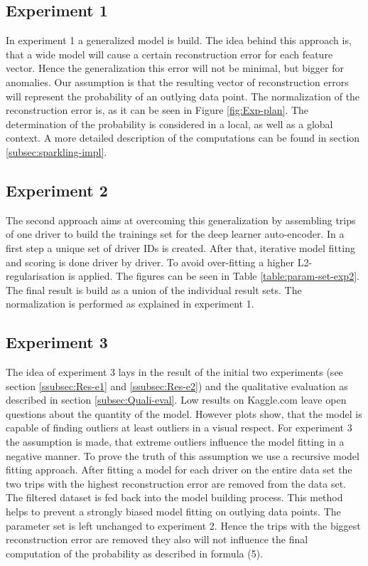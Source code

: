 \documentclass{vldb}
\begin{document}
\subsection{Experiment 1}
\label{subsec:exp-1}
In experiment 1 a generalized model is build. The idea behind this approach is, that a wide model will cause a certain reconstruction error for each feature vector. Hence the generalization this error will not be minimal, but bigger for anomalies. Our assumption is that the resulting vector of reconstruction errors will represent the probability of an outlying data point. The normalization of the reconstruction error is, as it can be seen in Figure \ref{fig:Exp-plan}. The determination of the probability is considered in a local, as well as a global context. A more detailed description of the computations can be found in section \ref{subsec:sparkling-impl}. 

\subsection{Experiment 2}
\label{subsec:exp-2}

The second approach aims at overcoming this generalization by assembling trips of one driver to build the trainings set for the deep learner auto-encoder. In a first step a unique set of driver IDs is created. After that, iterative model fitting and scoring is done driver by driver. To avoid over-fitting a higher L2-regularisation is applied. The figures can be seen in Table \ref{table:param-set-exp2}. The final result is build as a union of the individual result sets. The normalization is performed as explained in experiment 1.

\subsection{Experiment 3}
\label{subsec:exp-3}
The idea of experiment 3 lays in the result of the initial two experiments (see section \ref{ssubsec:Res-e1} and \ref{ssubsec:Res-e2}) and the qualitative evaluation as described in section \ref{subsec:Quali-eval}. Low results on Kaggle.com leave open questions about the quantity of the model. However plots show, that the model is capable of finding outliers at least outliers in a visual respect. For experiment 3 the assumption is made, that extreme outliers influence the model fitting in a negative manner. To prove the truth of this assumption we use a recursive model fitting approach. After fitting a model for each driver on the entire data set the two trips with the highest reconstruction error are removed from the data set. The filtered dataset is fed back into the model building process. This method helps to prevent a strongly biased model fitting on outlying data points. The parameter set is left unchanged to experiment 2. Hence the trips with the biggest reconstruction error are removed they also will not influence the final computation of the probability as described in formula (5).
\end{document}
